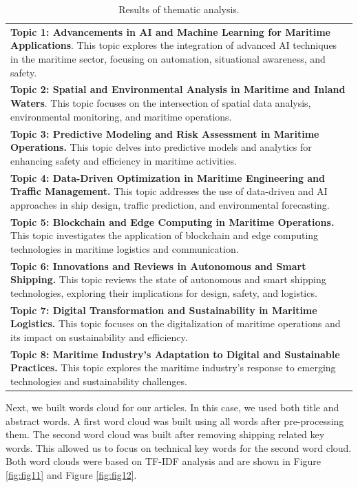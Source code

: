 \documentclass[a4paper, review, endfloat, doubleblind, authoryear]{elsarticle}
\begin{document}
	\begin{table}[h]
		\centering
		\caption{Results of thematic analysis.}
		\begin{tabularx}{\linewidth}{X}
			\hline
			\textbf{Topic 1: Advancements in AI and Machine Learning for Maritime Applications}. This topic explores the integration of advanced AI techniques in the maritime sector, focusing on automation, situational awareness, and safety.\\			
			\textbf{Topic 2: Spatial and Environmental Analysis in Maritime and Inland Waters}. This topic focuses on the intersection of spatial data analysis, environmental monitoring, and maritime operations.\\			
			\textbf{Topic 3: Predictive Modeling and Risk Assessment in Maritime Operations.} This topic delves into predictive models and analytics for enhancing safety and efficiency in maritime activities.\\			
			\textbf{Topic 4: Data-Driven Optimization in Maritime Engineering and Traffic Management.} This topic addresses the use of data-driven and AI approaches in ship design, traffic prediction, and environmental forecasting.\\			
			\textbf{Topic 5: Blockchain and Edge Computing in Maritime Operations.} This topic investigates the application of blockchain and edge computing technologies in maritime logistics and communication.\\			
			\textbf{Topic 6: Innovations and Reviews in Autonomous and Smart Shipping.} This topic reviews the state of autonomous and smart shipping technologies, exploring their implications for design, safety, and logistics.\\			
			\textbf{Topic 7: Digital Transformation and Sustainability in Maritime Logistics.} This topic focuses on the digitalization of maritime operations and its impact on sustainability and efficiency.\\			
			\textbf{Topic 8: Maritime Industry’s Adaptation to Digital and Sustainable Practices.} This topic explores the maritime industry's response to emerging technologies and sustainability challenges.\\
			\hline			
		\end{tabularx}
		\label{tab:thematic}
	\end{table}
	
	Next, we built words cloud for our articles. In this case, we used both title and abstract words. A first word cloud was built using all words after pre-processing them. The second word cloud was built after removing shipping related key words. This allowed us to focus on technical key words for the second word cloud. Both word clouds were based on TF-IDF analysis and are shown in Figure \ref{fig:fig11} and Figure \ref{fig:fig12}.
	
\end{document}
